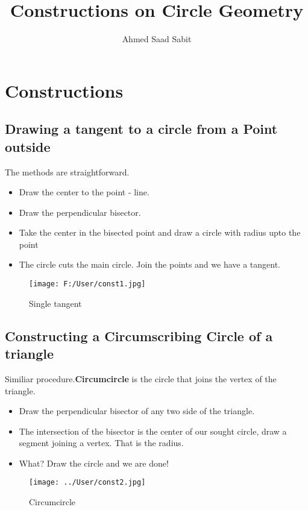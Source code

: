 \documentclass[10pt,a4paper,landscape]{article}
\author{Ahmed Saad Sabit}
\title{Constructions on Circle Geometry}
\begin{document}
\maketitle
\section{Constructions}

\subsection{Drawing a tangent to a circle from a Point outside}

The methods are straightforward.
\begin{itemize}
\item Draw the center to the point - line. 
\item Draw the perpendicular bisector.
\item Take the center in the bisected point and draw a circle with radius upto the point
\item The circle cuts the main circle. Join the points and we have a tangent.
\end{itemize}

\begin{figure}[hbtp]
\centering
\texttt{[image: F:/User/const1.jpg]}
\caption{Single tangent}
\end{figure}

\subsection{Constructing a Circumscribing Circle of a triangle}

Similiar procedure.\textbf{Circumcircle} is the circle that joins the vertex of the triangle.
\begin{itemize}
\item Draw the perpendicular bisector of any two side of the triangle.
\item The intersection of the bisector is the center of our sought circle, draw a segment joining a vertex. That is the radius.
\item What? Draw the circle and we are done!
\end{itemize}
\begin{figure}[hbtp]
\centering
\texttt{[image: ../User/const2.jpg]}
\caption{Circumcircle}
\end{figure}
\newpage
\end{document}

